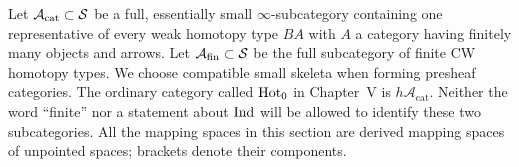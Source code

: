 \label{sec:F}

Let $\mathcal A_{\mathrm{cat}}\subset\mathcal S$ be a full, essentially small
$\infty$-subcategory containing one representative of every weak homotopy
type $BA$ with $A$ a category having finitely many objects and arrows.
Let $\mathcal A_{\mathrm{fin}}\subset\mathcal S$ be the full subcategory of finite
CW homotopy types. We choose compatible small skeleta when forming
presheaf categories. The ordinary category called $\mathrm{Hot}_0$ in Chapter~V
is $h\mathcal A_{\mathrm{cat}}$. Neither the word ``finite'' nor a
statement about $\operatorname{Ind}$ will be allowed to identify these two subcategories.
All the mapping spaces in this section are derived mapping spaces of
unpointed spaces; brackets denote their components.

